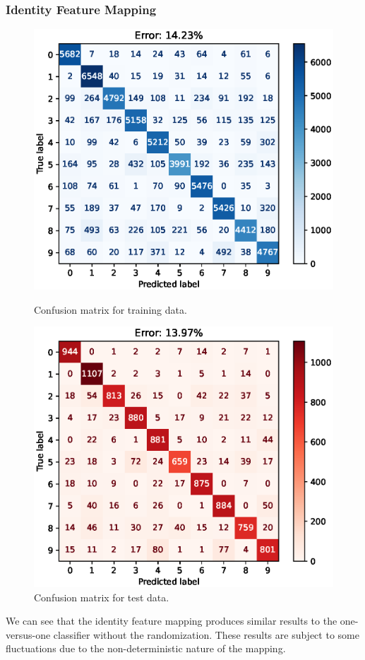 \documentclass{article}
\begin{document}
\subsubsection{Identity Feature Mapping}
\begin{figure}[h!]
    \centering
    \begin{minipage}{0.5\textwidth}
        \centering
        \includegraphics[width=\textwidth]{images/one_vs_all_training_confusion_matrix_Identity.eps}
        \caption{Confusion matrix for training data.}
    \end{minipage}\hfill
    \begin{minipage}{0.5\textwidth}
        \centering
        \includegraphics[width=\textwidth]{images/one_vs_all_test_confusion_matrix_Identity.eps}
        \caption{Confusion matrix for test data.}
    \end{minipage}
\end{figure}
We can see that the identity feature mapping produces similar results to the one-versus-one classifier without the randomization.
These results are subject to some fluctuations due to the non-deterministic nature of the mapping.
\end{document}
